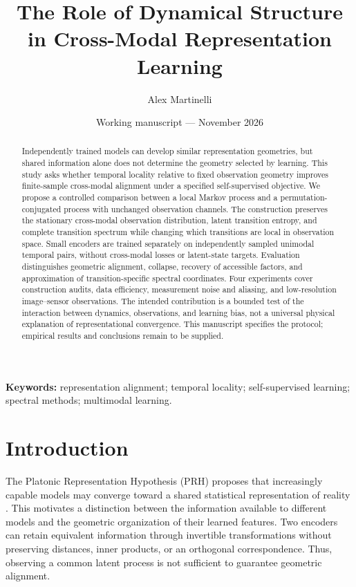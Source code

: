 \documentclass[11pt,a4paper]{article}
\title{The Role of Dynamical Structure in Cross-Modal Representation Learning}
\author{Alex Martinelli}
\date{Working manuscript --- November 2026}
\begin{document}
\maketitle

\begin{abstract}
Independently trained models can develop similar representation geometries, but shared information alone does not determine the geometry selected by learning. This study asks whether temporal locality relative to fixed observation geometry improves finite-sample cross-modal alignment under a specified self-supervised objective. We propose a controlled comparison between a local Markov process and a permutation-conjugated process with unchanged observation channels. The construction preserves the stationary cross-modal observation distribution, latent transition entropy, and complete transition spectrum while changing which transitions are local in observation space. Small encoders are trained separately on independently sampled unimodal temporal pairs, without cross-modal losses or latent-state targets. Evaluation distinguishes geometric alignment, collapse, recovery of accessible factors, and approximation of transition-specific spectral coordinates. Four experiments cover construction audits, data efficiency, measurement noise and aliasing, and low-resolution image--sensor observations. The intended contribution is a bounded test of the interaction between dynamics, observations, and learning bias, not a universal physical explanation of representational convergence. This manuscript specifies the protocol; empirical results and conclusions remain to be supplied.
\end{abstract}

\noindent\textbf{Keywords:} representation alignment; temporal locality; self-supervised learning; spectral methods; multimodal learning.

\section{Introduction}
The Platonic Representation Hypothesis (PRH) proposes that increasingly capable models may converge toward a shared statistical representation of reality \citep{huh2024}. This motivates a distinction between the information available to different models and the geometric organization of their learned features. Two encoders can retain equivalent information through invertible transformations without preserving distances, inner products, or an orthogonal correspondence. Thus, observing a common latent process is not sufficient to guarantee geometric alignment.
\end{document}
